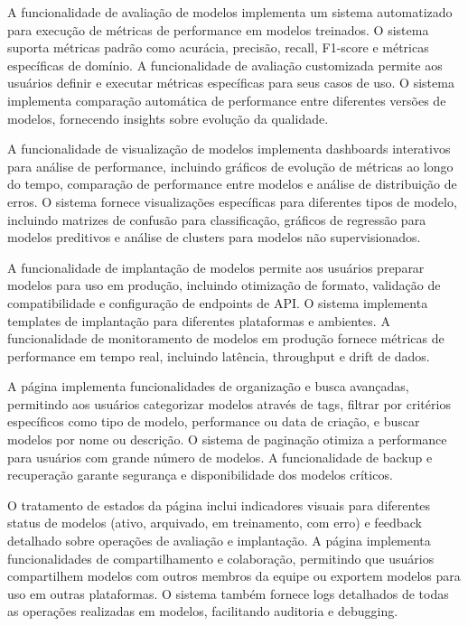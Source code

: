 \documentclass[12pt,a4paper]{article}
\begin{document}
A funcionalidade de avaliação de modelos implementa um sistema automatizado para execução de métricas de performance em modelos treinados. O sistema suporta métricas padrão como acurácia, precisão, recall, F1-score e métricas específicas de domínio. A funcionalidade de avaliação customizada permite aos usuários definir e executar métricas específicas para seus casos de uso. O sistema implementa comparação automática de performance entre diferentes versões de modelos, fornecendo insights sobre evolução da qualidade.

A funcionalidade de visualização de modelos implementa dashboards interativos para análise de performance, incluindo gráficos de evolução de métricas ao longo do tempo, comparação de performance entre modelos e análise de distribuição de erros. O sistema fornece visualizações específicas para diferentes tipos de modelo, incluindo matrizes de confusão para classificação, gráficos de regressão para modelos preditivos e análise de clusters para modelos não supervisionados.

A funcionalidade de implantação de modelos permite aos usuários preparar modelos para uso em produção, incluindo otimização de formato, validação de compatibilidade e configuração de endpoints de API. O sistema implementa templates de implantação para diferentes plataformas e ambientes. A funcionalidade de monitoramento de modelos em produção fornece métricas de performance em tempo real, incluindo latência, throughput e drift de dados.

A página implementa funcionalidades de organização e busca avançadas, permitindo aos usuários categorizar modelos através de tags, filtrar por critérios específicos como tipo de modelo, performance ou data de criação, e buscar modelos por nome ou descrição. O sistema de paginação otimiza a performance para usuários com grande número de modelos. A funcionalidade de backup e recuperação garante segurança e disponibilidade dos modelos críticos.

O tratamento de estados da página inclui indicadores visuais para diferentes status de modelos (ativo, arquivado, em treinamento, com erro) e feedback detalhado sobre operações de avaliação e implantação. A página implementa funcionalidades de compartilhamento e colaboração, permitindo que usuários compartilhem modelos com outros membros da equipe ou exportem modelos para uso em outras plataformas. O sistema também fornece logs detalhados de todas as operações realizadas em modelos, facilitando auditoria e debugging.
\end{document}
